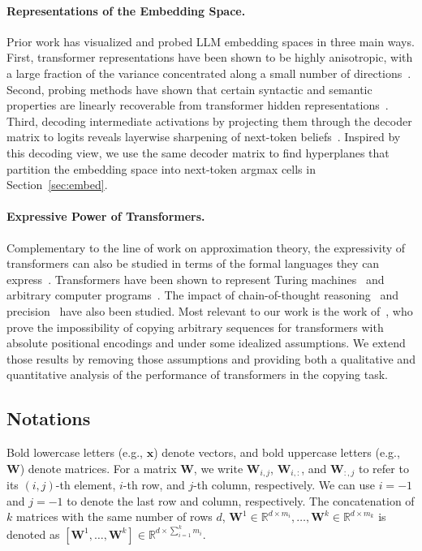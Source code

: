 \paragraph{Representations of the Embedding Space.}
Prior work has visualized and probed LLM embedding spaces in three main ways. First, transformer representations have been shown to be highly anisotropic, with a large fraction of the variance concentrated along a small number of directions~\citep{mu2018all, ethayarajh-2019-contextual}. 
Second, probing methods have shown that certain syntactic and semantic properties are linearly recoverable from transformer hidden representations~\citep{alain2016understanding,hewitt2019structural,kornblith2019similarity}.
Third, decoding intermediate activations by projecting them through the decoder matrix to logits reveals layerwise sharpening of next-token beliefs~\citep{nostalgebraist2020logit,belrose2023eliciting}.
Inspired by this decoding view, we use the same decoder matrix to find hyperplanes that partition the embedding space into next-token argmax cells in Section~\ref{sec:embed}.

\paragraph{Expressive Power of Transformers.}
Complementary to the line of work on approximation theory, the expressivity of transformers can also be studied in terms of the formal languages they can express~\citep{strobl-etal-2024-formal}. Transformers have been shown to represent Turing machines~\citep{NEURIPS2022_4ebf1d74} and arbitrary computer programs~\citep{pmlr-v202-giannou23a}. The impact of chain-of-thought reasoning~\citep{merrill2024the} and precision~\citep{chiang2025transformers} have also been studied. Most relevant to our work is the work of~\citet{huang2025a}, who prove the impossibility of copying arbitrary sequences for transformers with absolute positional encodings and under some idealized assumptions. We extend those results by removing those assumptions and providing both a qualitative and quantitative analysis of the performance of transformers in the copying task.

\subsection{Notations}

Bold lowercase letters (e.g., $\mathbf{x}$) denote vectors, and bold uppercase letters (e.g., $\mathbf{W}$) denote matrices. For a matrix $\mathbf{W}$, we write $\mathbf{W}_{i,j}$, $\mathbf{W}_{i,:}$, and $\mathbf{W}_{:,j}$ to refer to its $(i,j)$-th element, $i$-th row, and $j$-th column, respectively. We can use $i=-1$ and $j=-1$ to denote the last row and column, respectively. The concatenation of $k$ matrices with the same number of  rows  $d$, $\mathbf W^1\in\mathbb R^{d\times m_i},\dots,\mathbf W^k\in\mathbb R^{d\times m_k}$ is denoted as $[\mathbf W^1,\dots,\mathbf W^k]\in\mathbb R^{d\times\sum_{i=1}^km_i}$.

